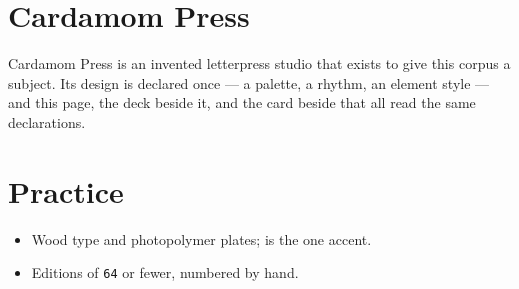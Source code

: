 \documentclass{article}
\begin{document}
\section{Cardamom Press}

Cardamom Press is an invented letterpress studio that exists to give this
corpus a subject. Its design is declared once — a palette, a rhythm, an
element style — and this page, the deck beside it, and the card beside
that all read the same declarations.

\section{Practice}

\begin{itemize}
  \item Wood type and photopolymer plates;  is the one accent.
  \item Editions of \texttt{64} or fewer, numbered by hand.
\end{itemize}

\end{document}
